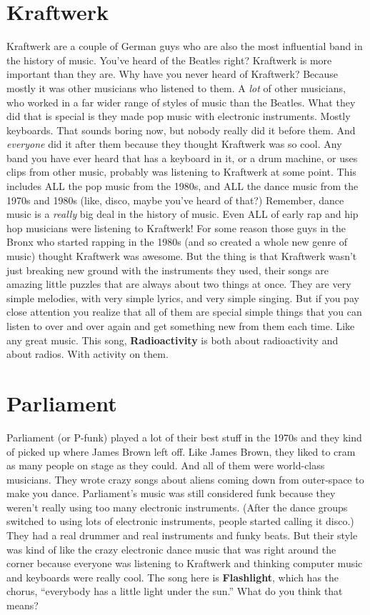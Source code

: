 \documentclass[letterpaper,single]{article}
\begin{document}
\section{Kraftwerk}
Kraftwerk are a couple of German guys who are also the most influential band in the history of music. 
You've heard of the Beatles right? 
Kraftwerk is more important than they are. 
Why have you never heard of Kraftwerk? 
Because mostly it was other musicians who listened to them. 
A \emph{lot} of other musicians, who worked in a far wider range of styles of music than the Beatles. 
What they did that is special is they made pop music with electronic instruments. 
Mostly keyboards. 
That sounds boring now, but nobody really did it before them. 
And \emph{everyone} did it after them because they thought Kraftwerk was so cool. 
Any band you have ever heard that has a keyboard in it, or a drum machine, or uses clips from other music, probably was listening to Kraftwerk at some point. 
This includes ALL the pop music from the 1980s, and ALL the dance music from the 1970s and 1980s (like, disco, maybe you've heard of that?)
Remember, dance music is a \emph{really} big deal in the history of music.
Even ALL of early rap and hip hop musicians were listening to Kraftwerk! 
For some reason those guys in the Bronx who started rapping in the 1980s (and so created a whole new genre of music) thought Kraftwerk was awesome. 
But the thing is that Kraftwerk wasn't just breaking new ground with the instruments they used, their songs are amazing little puzzles that are always about two things at once. 
They are very simple melodies, with very simple lyrics, and very simple singing. 
But if you pay close attention you realize that all of them are special simple things that you can listen to over and over again and get something new from them each time. 
Like any great music. 
This song, \textbf{Radioactivity} is both about radioactivity and about radios. With activity on them.

\section{Parliament}
Parliament (or P-funk) played a lot of their best stuff in the 1970s and they kind of picked up where James Brown left off. 
Like James Brown, they liked to cram as many people on stage as they could. 
And all of them were world-class musicians. 
They wrote crazy songs about aliens coming down from outer-space to make you dance. 
Parliament's music was still considered funk because they weren't really using too many electronic instruments. 
(After the dance groups switched to using lots of electronic instruments, people started calling it disco.) 
They had a real drummer and real instruments and funky beats.
But their style was kind of like the crazy electronic dance music that was right around the corner because everyone was listening to Kraftwerk and thinking computer music and keyboards were really cool.
The song here is \textbf{Flashlight}, which has the chorus, ``everybody has a little light under the sun.'' What do you think that means?
\end{document}
